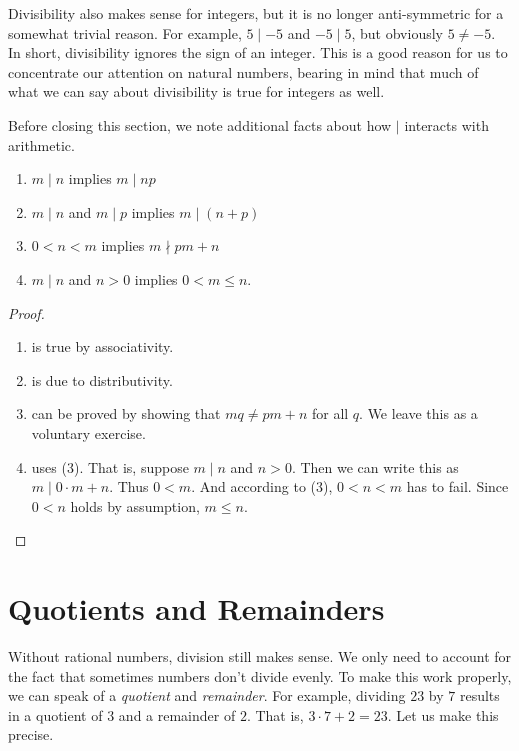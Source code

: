 Divisibility also makes sense for integers, but it is no longer anti-symmetric for a somewhat trivial reason.
For example, $5\mid -5$ and $-5\mid 5$, but obviously $5\neq -5$. In short, divisibility ignores the sign of an integer.
This is a good reason for us to concentrate our attention on natural numbers, bearing in mind that much of what we can say about divisibility is true for integers as well.

Before closing this section, we note additional facts about how $\mid$ interacts with arithmetic.

\begin{prop}
  \begin{enumerate}
    \item $m\mid n$ implies $m\mid np$
    \item $m\mid n$ and $m\mid p$ implies $m\mid (n+p)$
    \item $0<n<m$ implies $m\nmid pm+n$
    \item $m\mid n$ and $n>0$ implies $0< m\leq n$.
  \end{enumerate}

  \begin{proof}
  	\begin{enumerate}
    \item is true by associativity.
    \item is due to distributivity.
    \item can be proved by showing that $mq\neq pm + n$ for all $q$.
    We leave this as a voluntary exercise.
    \item uses (3). That is, suppose $m\mid n$ and $n>0$. 
    Then we can write this as $m \mid 0\cdot m + n$. Thus $0<m$.
    And according to (3), $0<n<m$ has to fail.
    Since $0<n$ holds by assumption, $m\leq n$.
    \end{enumerate}
  \end{proof}
\end{prop}

\section{Quotients and Remainders}

Without rational numbers, division still makes sense. 
We only need to account for the fact that sometimes numbers don't divide evenly.
To make this work properly, we can speak of a \emph{quotient} and \emph{remainder}. 
For example, dividing $23$ by $7$ results in a quotient of $3$ and a remainder of $2$. 
That is, $3\cdot 7 + 2 = 23$. 
Let us make this precise.

